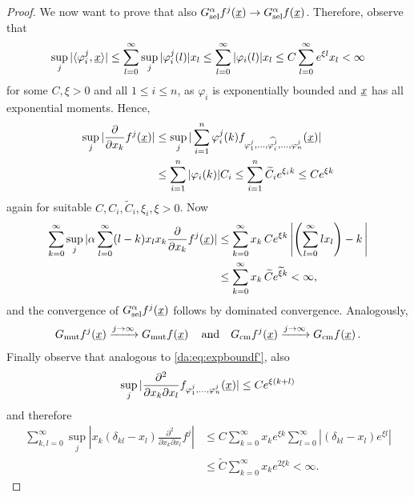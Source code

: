 \begin{proof}
\noindent
We now want to prove that also $G^{\alpha}_{\text{sel}} f^j \! \left( \underline{x} \right) \rightarrow G^{\alpha}_{\text{sel}} f \! \left( \underline{x} \right)$. Therefore, 
observe that
\begin{align*}
\sup_j | \langle \varphi_i^j,\underline{x} \rangle |
 \leq \sum_{l=0}^\infty \sup_j | \varphi_i^j(l) | x_l 
 \leq \sum_{l=0}^\infty | \varphi_i(l) | x_l 
 \leq C \sum_{l=0}^\infty e^{\xi l} x_l 
  < \infty
\end{align*}
for some $C,\xi >0$ and all $1 \leq i \leq n$, as $\varphi_i$ is exponentially bounded and
$\underline{x}$ has all exponential moments. Hence,
\begin{align} \label{da:eq:expboundf'}
\sup_j | \frac{\partial}{\partial x_k} f^j (\underline{x})| 
& \leq \sup_j | \sum_{i=1}^n \varphi_i^j(k)
	f_{\varphi^j_1,\ldots,\widehat{\varphi^j_i},\ldots,\varphi^j_n}(\underline{x}) | \\
& \leq \sum_{i=1}^n | \varphi_i(k) | C_i 
 \leq \sum_{i=1}^n \widetilde{C}_i e^{\xi_i k} 
 \leq C e^{\xi k}
\end{align}
again for suitable $C,C_i,\widetilde{C}_i,\xi_i,\xi > 0$. Now
\begin{align*}
\sum_{k=0}^\infty \sup_j | \alpha \sum_{l=0}^\infty (l-k) x_l x_k \frac{\partial}{\partial x_k} f^j
	(\underline{x}) | 
& \leq \sum_{k=0}^\infty x_k \, C
e^{\xi k} \left| \left( \sum_{l=0}^\infty l x_l \right) - k \, \right| \\
& \leq \sum_{k=0}^\infty x_k \, \widetilde{C} e^{\widetilde{\xi} k} < \infty,
\end{align*} 
and the convergence of $G^{\alpha}_{\text{sel}} f^j \! \left( \underline{x} \right)$ follows by dominated convergence.
Analogously, 
\begin{align*}
G_{\text{mut}} f^j \! \left( \underline{x} \right) \xrightarrow{j \to \infty} G_{\text{mut}} f \! \left( \underline{x} \right)
\quad \text{and} \quad
G_{\text{cm}} f^j \! \left( \underline{x} \right) \xrightarrow{j \to \infty} G_{\text{cm}} f \! \left( \underline{x} \right).
\end{align*}
Finally observe that analogous to \eqref{da:eq:expboundf'}, also
\begin{align*}
\sup_j | \frac{\partial^2}{\partial x_k \partial x_l} f_{\varphi_1^j,\ldots,\varphi_n^j}
(\underline{x}) | \leq C e^{\xi (k+l)}
\end{align*}
and therefore
\begin{equation}
\label{da:wq:Gresbounded}
\begin{aligned}
\sum_{k,l=0}^\infty \sup_j | x_k (\delta_{kl} - x_l) \frac{\partial^2}{\partial x_k \partial x_l}
	f^j |
& \leq C \sum_{k=0}^\infty x_k e^{\xi k} \sum_{l=0}^\infty | (\delta_{kl} - x_l) e^{\xi l} | \\
& \leq \widetilde{C} \sum_{k=0}^\infty x_k e^{2 \xi k} < \infty.
\end{aligned}
\end{equation}


\end{proof}
